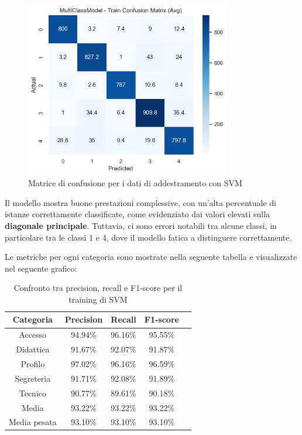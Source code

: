 \begin{figure}[H]
    \centering
    \includegraphics[width=0.8\textwidth]{images/confusion_matrix_train_svm.png}
    \caption{Matrice di confusione per i dati di addestramento con SVM}
    \label{fig:confusion_matrix_train_svm}
\end{figure}

Il modello mostra buone prestazioni complessive, con un’alta percentuale di istanze correttamente classificate, come evidenziato dai valori elevati sulla \textbf{diagonale principale}. Tuttavia, ci sono errori notabili tra alcune classi, in particolare tra le classi 1 e 4, dove il modello fatica a distinguere correttamente.

\newpage

Le metriche per ogni categoria sono mostrate nella seguente tabella e visualizzate nel seguente grafico:

\begin{table}[H]
    \centering
    \begin{tabular}{|c|c|c|c|c|}
        \hline
        \textbf{Categoria} & \textbf{Precision} & \textbf{Recall} & \textbf{F1-score} \\
        \hline
        Accesso & 94.94\% & 96.16\% & 95.55\% \\
        \hline
        Didattica & 91.67\% & 92.07\% & 91.87\% \\
        \hline
        Profilo & 97.02\% & 96.16\% & 96.59\% \\
        \hline
        Segreteria & 91.71\% & 92.08\% & 91.89\% \\
        \hline
        Tecnico & 90.77\% & 89.61\% & 90.18\% \\
        \hline
        Media & 93.22\% & 93.22\% & 93.22\% \\
        \hline
        Media pesata & 93.10\% & 93.10\% & 93.10\% \\
        \hline
    \end{tabular}
    \caption{Confronto tra precision, recall e F1-score per il training di SVM}
    \label{tab:metriche_svm_train}
\end{table}

